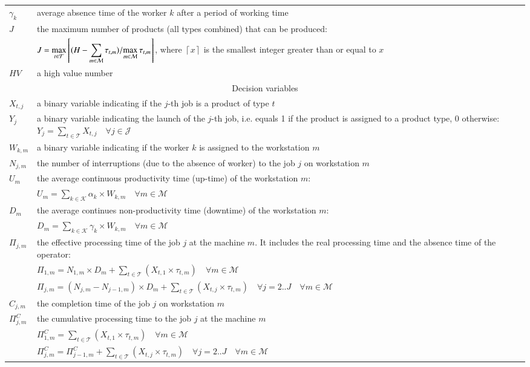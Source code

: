 \documentclass[review,12pt, 3p, times]{elsarticle}
\begin{document}
\begin{longtable}{p{} p{}}
    $\gamma_k$    & average absence time of the worker $k$ after a period of working time\\
    $J$           & the maximum number of products (all types combined) that can be produced:\\
	           & $J=\displaystyle\max_{t\in{\cal T}}\left\lceil {(H-\sum_{m\in\mathcal{M}} \tau_{t,m})}/{\max_{m\in\mathcal{M}} \tau_{t,m}}\right\rceil$, where $\left\lceil x    \right\rceil $   is the smallest integer greater than or equal to $x$ \\
    $HV$          & a high value number\\
    \hline
    \multicolumn{2}{c}{Decision variables }\\
    \hline		
    $X_{t,j}$     & a binary variable indicating if the $j$-th job is a product of type $t$ \\
    $Y_j$         & a binary variable indicating the launch of the $j$-th job, i.e. equals 1 if the product is assigned to a product type, 0 otherwise: $Y_j = {\sum_{t\in \mathcal{T}} X_{t,j}} \quad\forall{j \in\mathcal{J} }$ \\
    $W_{k,m}$     & a binary variable indicating if the worker $k$ is assigned to the workstation $m$\\
    $N_{j,m}$     & the number of interruptions (due to the absence of worker) to the job $j$ on workstation  $m$\\
    $U_m$         & the average continuous productivity time (up-time) of the workstation $m$:\\ 
                  & $U_m=\sum_{k\in \mathcal{K}} \alpha_k \times W_{k,m} \quad \forall{ m \in  \mathcal{M}}$\\
    $D_m$         & the average continues non-productivity time (downtime) of the workstation $m$: \\
                  & $D_m = \sum_{k\in\mathcal{K}} \gamma_k \times W_{k,m} \quad\forall m\in\mathcal{M}$\\
    $\Pi_{j,m}$   & the effective processing time of the job $j$ at the machine $m$. It includes the real processing time and the absence time of the operator:\\
	           & $\Pi_{1,m} = N_{1,m}\times D_m  + \sum_{t\in\mathcal{T}} ( X_{t,1} \times\tau_{t,m}) \quad \forall m\in\mathcal{M} $\\
	             & $\Pi_{j,m} =  (N_{j,m}-N_{j-1,m})\times D_m + \sum_{t\in \mathcal{T}}(X_{t,j} \times \tau_{t,m})\quad\forall{j=2..J} \quad  \forall m\in\mathcal{M}$\\
    $C_{j,m}$     & the completion time of the job $j$ on workstation  $m$\\
    $\Pi^C_{j,m}$ & the cumulative processing time to the job $j$ at the machine $m$\\
	             & $\Pi^C_{1,m} = \sum_{t\in \mathcal{T}} (X_{t,1} \times\tau_{t,m})\quad\forall m \in\mathcal{M}$\\
	             & $\Pi^C_{j,m} =\Pi^C_{j-1,m} +  \sum_{t\in \mathcal{T}} (X_{t,j} \times \tau_{t,m} ) \quad\forall j=2..J \quad\forall m \in\mathcal{M}$  \\							
    \hline
\end{longtable}		
	
\end{document}

